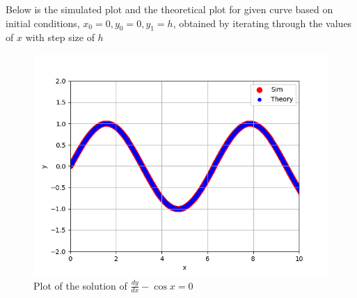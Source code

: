 \documentclass[journal]{IEEEtran}
\begin{document}
Below is the simulated plot and the theoretical plot for given curve based on initial conditions, $x_0 = 0, y_0 = 0, y_1 = h$, obtained by iterating through the values of $x$ with step size of $h$
\begin{figure}[h!]
	\centering
	\includegraphics[width=1\columnwidth]{figs/simulated.png}
	\caption{Plot of the solution of $\frac{dy}{dx} - \cos x = 0$}
	\label{stemplot}
\end{figure}
\end{document}
